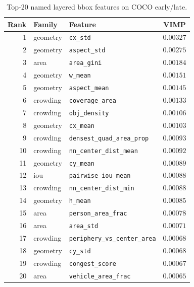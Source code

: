 \begin{table}[ht]
\centering
\caption{Top-20 named layered bbox features on COCO early/late.}
\label{tab:coco-layered-top20}
\small
\begin{tabular}{@{}r l l c@{}}
\toprule
Rank & Family & Feature & VIMP \\
\midrule
1 & geometry & \texttt{cx\_std} & $0.00327$ \\
2 & geometry & \texttt{aspect\_std} & $0.00275$ \\
3 & area & \texttt{area\_gini} & $0.00184$ \\
4 & geometry & \texttt{w\_mean} & $0.00151$ \\
5 & geometry & \texttt{aspect\_mean} & $0.00145$ \\
6 & crowding & \texttt{coverage\_area} & $0.00133$ \\
7 & crowding & \texttt{obj\_density} & $0.00106$ \\
8 & geometry & \texttt{cx\_mean} & $0.00103$ \\
9 & crowding & \texttt{densest\_quad\_area\_prop} & $0.00093$ \\
10 & crowding & \texttt{nn\_center\_dist\_mean} & $0.00092$ \\
11 & geometry & \texttt{cy\_mean} & $0.00089$ \\
12 & iou & \texttt{pairwise\_iou\_mean} & $0.00088$ \\
13 & crowding & \texttt{nn\_center\_dist\_min} & $0.00088$ \\
14 & geometry & \texttt{h\_mean} & $0.00085$ \\
15 & area & \texttt{person\_area\_frac} & $0.00078$ \\
16 & area & \texttt{area\_std} & $0.00071$ \\
17 & crowding & \texttt{periphery\_vs\_center\_area} & $0.00068$ \\
18 & geometry & \texttt{cy\_std} & $0.00068$ \\
19 & crowding & \texttt{congest\_score} & $0.00067$ \\
20 & area & \texttt{vehicle\_area\_frac} & $0.00065$ \\
\bottomrule
\end{tabular}
\end{table}
